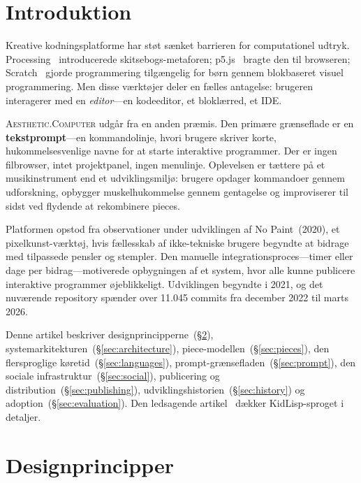 \documentclass[10pt,letterpaper,twocolumn]{article}
\newcommand{\ac}{\textsc{Aesthetic.Computer}}
\begin{document}

\section{Introduktion}

Kreative kodningsplatforme har støt sænket barrieren for computationel udtryk. Processing~\citep{reas2007processing} introducerede skitsebogs-metaforen; p5.js~\citep{mccarthy2015p5js} bragte den til browseren; Scratch~\citep{resnick2009scratch} gjorde programmering tilgængelig for børn gennem blokbaseret visuel programmering. Men disse værktøjer deler en fælles antagelse: brugeren interagerer med en \emph{editor}---en kodeeditor, et bloklærred, et IDE.

\ac{} udgår fra en anden præmis. Den primære grænseflade er en \textbf{tekstprompt}---en kommandolinje, hvori brugere skriver korte, hukommelsesvenlige navne for at starte interaktive programmer. Der er ingen filbrowser, intet projektpanel, ingen menulinje. Oplevelsen er tættere på et musikinstrument end et udviklingsmiljø: brugere opdager kommandoer gennem udforskning, opbygger muskelhukommelse gennem gentagelse og improviserer til sidst ved flydende at rekombinere pieces.

Platformen opstod fra observationer under udviklingen af No Paint~(2020), et pixelkunst-værktøj, hvis fællesskab af ikke-tekniske brugere begyndte at bidrage med tilpassede pensler og stempler. Den manuelle integrationsproces---timer eller dage per bidrag---motiverede opbygningen af et system, hvor alle kunne publicere interaktive programmer øjeblikkeligt. Udviklingen begyndte i 2021, og det nuværende repository spænder over 11.045 commits fra december 2022 til marts 2026.

Denne artikel beskriver designprincipperne~(\S\ref{sec:principles}), systemarkitekturen~(\S\ref{sec:architecture}), piece-modellen~(\S\ref{sec:pieces}), den flersproglige køretid~(\S\ref{sec:languages}), prompt-grænsefladen~(\S\ref{sec:prompt}), den sociale infrastruktur~(\S\ref{sec:social}), publicering og distribution~(\S\ref{sec:publishing}), udviklingshistorien~(\S\ref{sec:history}) og adoption~(\S\ref{sec:evaluation}). Den ledsagende artikel~\citep{scudder2026kidlisp} dækker KidLisp-sproget i detaljer.


\section{Designprincipper}
\label{sec:principles}
\end{document}
